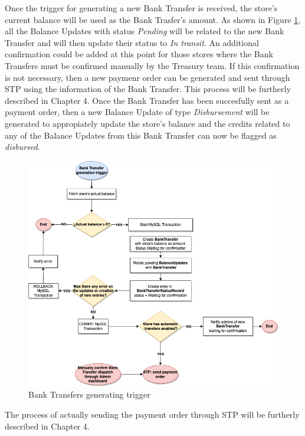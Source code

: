 Once the trigger for generating a new Bank Transfer is received, the store's current balance will be used as the Bank Trasfer's amount. As shown in Figure \ref{fig:bank_Transfer_trigger}, all the Balance Updates with status \textit{Pending} will be related to the new Bank Transfer and will then update their status to \textit{In transit}. An additional confirmation could be added at this point for those stores where the Bank Transfers must be confirmed manually by the Treasury team. If this confirmation is not necessary, then a new paymenr order can be generated and sent through STP using the information of the Bank Transfer. This process will be furtherly described in Chapter 4. Once the Bank Transfer has been succesfully sent as a payment order, then a new Balance Update of type \textit{Disbursement} will be generated to appropiately update the store's balance and the credits related to any of the Balance Updates from this Bank Transfer can now be flagged as \textit{disbursed}.\\

\begin{figure} [H]
    \centering
    \includegraphics[scale = 0.4]{assets/flowcharts/BankTransferTrigger.png}
    \caption{Bank Transfers generating trigger}\label{fig:bank_Transfer_trigger}
\end{figure}

The process of actually sending the payment order through STP will be furtherly described in Chapter 4.\\

